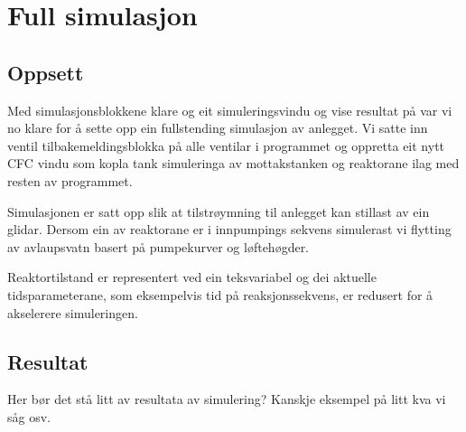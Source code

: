 \section{Full simulasjon}
\thispagestyle{fancy}

\subsection{Oppsett}
Med simulasjonsblokkene klare og eit simuleringsvindu og vise resultat på var vi
no klare for å sette opp ein fullstending simulasjon av anlegget.
Vi satte inn ventil tilbakemeldingsblokka på alle ventilar i programmet og oppretta eit
nytt CFC vindu som kopla tank simuleringa av mottakstanken og reaktorane ilag med resten av
programmet.

Simulasjonen er satt opp slik at tilstrøymning til anlegget kan stillast av ein glidar.
Dersom ein av reaktorane er i innpumpings sekvens simulerast vi flytting av avlaupsvatn
basert på pumpekurver og løftehøgder.

Reaktortilstand er representert ved ein teksvariabel og
dei aktuelle tidsparameterane, som eksempelvis tid på reaksjonssekvens,
er redusert for å akselerere simuleringen.

\subsection{Resultat}

Her bør det stå litt av resultata av simulering? \newline
Kanskje eksempel på litt kva vi såg osv. \newline
